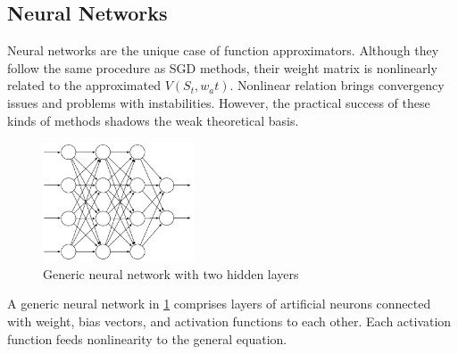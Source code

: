 \subsection{Neural Networks}
Neural networks are the unique case of function approximators. Although they follow the same procedure as SGD methods, their weight matrix is nonlinearly related to the approximated \(V(S_t,w_at)\). Nonlinear relation brings convergency issues and problems with instabilities. However, the practical success of these kinds of methods shadows the weak theoretical basis.

\begin{figure}[htbp]
    \centering
    \includegraphics[width=0.4\textwidth]{figures/nn}
    \caption{Generic neural network with two hidden layers}
    \label{fig:nn}
\end{figure}

A generic neural network in \ref{fig:nn} comprises layers of artificial neurons connected with weight, bias vectors, and activation functions to each other. Each activation function feeds nonlinearity to the general equation. 

 

 
